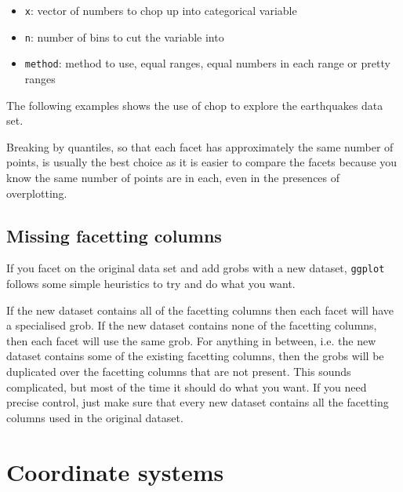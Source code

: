 \begin{itemize}
	\item {\tt x}: vector of numbers to chop up into categorical variable
	\item {\tt n}: number of bins to cut the variable into
	\item {\tt method}: method to use, equal ranges, equal numbers in each range or pretty ranges
\end{itemize}

The following examples shows the use of chop to explore the earthquakes data set.


Breaking by quantiles, so that each facet has approximately the same number of points, is usually the best choice as it is easier to compare the facets because you know the same number of points are in each, even in the presences of overplotting.

\subsection{Missing facetting columns}\label{sub:missing_facetting_columsn}

If you facet on the original data set and add grobs with a new dataset, {\tt ggplot} follows some simple heuristics to try and do what you want.  

If the new dataset contains all of the facetting columns then each facet will have a specialised grob. If the new dataset contains none of the facetting columns, then each facet will use the same grob.  For anything in between, i.e. the new dataset contains some of the existing facetting columns, then the grobs will be duplicated over the facetting columns that are not present.  This sounds complicated, but most of the time it should do what you want.  If you need precise control, just make sure that every new dataset contains all the facetting columns used in the original dataset.


\section{Coordinate systems}
\label{sec:coord}

